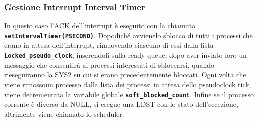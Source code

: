 \documentclass{article}
\begin{document}
\subsubsection{Gestione Interrupt Interval Timer}
In questo caso l'ACK  dell'interrupt è eseguito con la chiamata \texttt{\textbf{setIntervalTimer(PSECOND)}}. Dopodiché avvienelo sblocco di tutti i processi che erano in attesa dell'interrupt, rimuovendo ciascuno di essi dalla lista \texttt{\textbf{Locked\_pseudo\_clock}}, inserendoli sulla ready queue, dopo aver inviato loro un messaggio che consentirà ai processi 
interessati di sbloccarsi, quando rieseguiranno la SYS2 su cui si erano precedentemente bloccati. Ogni volta che viene rimossoun processo dalla lista dei processi in attesa dello pseudoclock tick, viene decrementata la variabile globale 
\texttt{\textbf{soft\_blocked\_count}}. Infine se il processo corrente è diverso da NULL, si esegue una LDST con lo stato 
dell'eccezione, altrimente viene chiamato lo scheduler.
\end{document}
